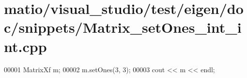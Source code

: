\hypertarget{matio_2visual__studio_2test_2eigen_2doc_2snippets_2_matrix__set_ones__int__int_8cpp_source}{}\section{matio/visual\+\_\+studio/test/eigen/doc/snippets/\+Matrix\+\_\+set\+Ones\+\_\+int\+\_\+int.cpp}
\label{matio_2visual__studio_2test_2eigen_2doc_2snippets_2_matrix__set_ones__int__int_8cpp_source}

\begin{DoxyCode}
00001 MatrixXf m;
00002 m.setOnes(3, 3);
00003 cout << m << endl;
\end{DoxyCode}
